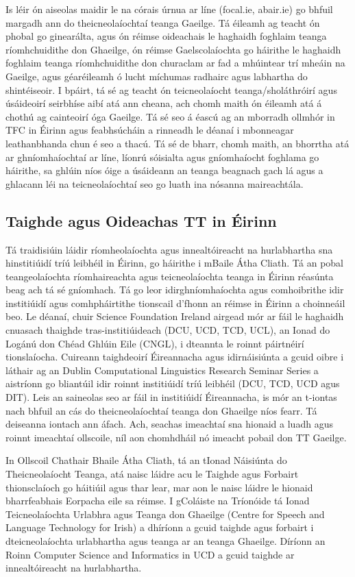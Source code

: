 \begin{multicols}{2}
Is léir ón aiseolas maidir le na córais úrnua ar líne (focal.ie, abair.ie) go bhfuil margadh ann do theicneolaíochtaí teanga Gaeilge. Tá éileamh ag teacht ón phobal go ginearálta, agus ón réimse oideachais le haghaidh foghlaim teanga ríomhchuidithe don Ghaeilge, ón réimse Gaelscolaíochta go háirithe le haghaidh foghlaim teanga ríomhchuidithe don churaclam ar fad a mhúintear trí mheáin na Gaeilge, agus géaréileamh ó lucht míchumas radhairc agus labhartha do shintéiseoir. I bpáirt, tá sé ag teacht ón teicneolaíocht teanga/sholáthróirí agus úsáideoirí seirbhíse aibí atá ann cheana, ach chomh maith ón éileamh atá á chothú ag cainteoirí óga Gaeilge. Tá sé seo á éascú ag an mborradh ollmhór in TFC in Éirinn agus feabhsúcháin a rinneadh le déanaí i mbonneagar leathanbhanda chun é seo a thacú. Tá sé de bharr, chomh maith, an bhorrtha atá ar ghníomhaíochtaí ar líne, líonrú sóisialta agus gníomhaíocht foghlama go háirithe, sa ghlúin níos óige a úsáideann an teanga beagnach gach lá agus a ghlacann léi na teicneolaíochtaí seo go luath ina nósanna maireachtála.


\subsection{Taighde agus Oideachas TT in Éirinn}

Tá traidisiúin láidir ríomheolaíochta agus innealtóireacht na hurlabhartha sna hinstitiúidí tríú leibhéil in Éirinn, go háirithe i mBaile Átha Cliath. Tá an pobal teangeolaíochta ríomhaireachta agus teicneolaíochta teanga in Éirinn réasúnta beag ach tá sé gníomhach. Tá go leor idirghníomhaíochta agus comhoibrithe idir institiúidí agus comhpháirtithe tionscail d'fhonn an réimse in Éirinn a choinneáil beo. Le déanaí, chuir Science Foundation Ireland airgead mór ar fáil le haghaidh cnuasach thaighde tras-institiúideach (DCU, UCD, TCD, UCL), an Ionad do Logánú don Chéad Ghlúin Eile (CNGL), i  dteannta le roinnt páirtnéirí tionslaíocha. Cuireann taighdeoirí Éireannacha agus idirnáisiúnta a gcuid oibre i láthair ag an Dublin Computational Linguistics Research Seminar Series a aistríonn go bliantúil idir roinnt institiúidí tríú leibhéil (DCU, TCD, UCD agus DIT). Leis an saineolas seo ar fáil in institiúidí Éireannacha, is mór an t-iontas nach bhfuil an cás do theicneolaíochtaí teanga don Ghaeilge níos fearr. Tá deiseanna iontach ann áfach. Ach, seachas imeachtaí sna hionaid a luadh agus roinnt imeachtaí ollscoile, níl aon chomhdháil nó imeacht pobail don TT Gaeilge.

In Ollscoil Chathair Bhaile Átha Cliath, tá an tIonad Náisiúnta do Theicneolaíocht Teanga, atá naisc láidre acu le Taighde agus Forbairt thionsclaíoch go háitiúil agus thar lear, mar aon le naisc láidre le hionaid bharrfeabhais Eorpacha eile sa réimse. I gColáiste na Tríonóide tá Ionad Teicneolaíochta Urlabhra agus Teanga don Ghaeilge (Centre for Speech and Language Technology for Irish) a dhíríonn a gcuid taighde agus forbairt i dteicneolaíochta urlabhartha agus teanga ar an teanga Ghaeilge. Díríonn an Roinn Computer Science and Informatics in UCD a gcuid taighde ar innealtóireacht na hurlabhartha.



\end{multicols}
